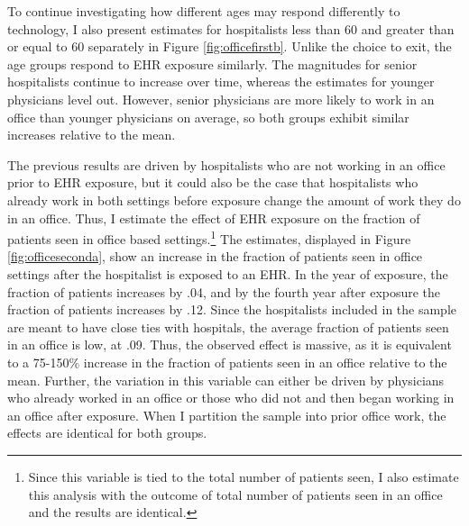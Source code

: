 \documentclass[12pt]{article}
\begin{document}
To continue investigating how different ages may respond differently to technology, I also present estimates for hospitalists less than 60 and greater than or equal to 60 separately in Figure \ref{fig:officefirstb}. Unlike the choice to exit, the age groups respond to EHR exposure similarly. The magnitudes for senior hospitalists continue to increase over time, whereas the estimates for younger physicians level out. However, senior physicians are more likely to work in an office than younger physicians on average, so both groups exhibit similar increases relative to the mean. 

The previous results are driven by hospitalists who are not working in an office prior to EHR exposure, but it could also be the case that hospitalists who already work in both settings before exposure change the amount of work they do in an office. Thus, I estimate the effect of EHR exposure on the fraction of patients seen in office based settings.\footnote{Since this variable is tied to the total number of patients seen, I also estimate this analysis with the outcome of total number of patients seen in an office and the results are identical.} The estimates, displayed in Figure \ref{fig:officeseconda}, show an increase in the fraction of patients seen in office settings after the hospitalist is exposed to an EHR. In the year of exposure, the fraction of patients increases by .04, and by the fourth year after exposure the fraction of patients increases by .12. Since the hospitalists included in the sample are meant to have close ties with hospitals, the average fraction of patients seen in an office is low, at .09. Thus, the observed effect is massive, as it is equivalent to a 75-150\% increase in the fraction of patients seen in an office relative to the mean. Further, the variation in this variable can either be driven by physicians who already worked in an office or those who did not and then began working in an office after exposure. When I partition the sample into prior office work, the effects are identical for both groups. 
\end{document}
